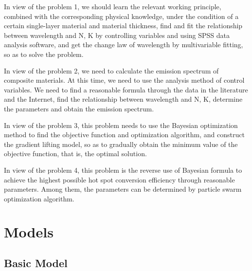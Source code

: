 \documentclass{apmcmthesis}
\begin{document}
In view of the problem 1, we should learn the relevant working principle, combined with the corresponding physical knowledge, under the condition of a certain single-layer material and material thickness, find and fit the relationship between wavelength and N, K by controlling variables and using SPSS data analysis software, and get the change law of wavelength by multivariable fitting, so as to solve the problem.\par

In view of the problem 2, we need to calculate the emission spectrum of composite materials. At this time, we need to use the analysis method of control variables. We need to find a reasonable formula through the data in the literature and the Internet, find the relationship between wavelength and N, K, determine the parameters and obtain the emission spectrum.\par

In view of the problem 3, this problem needs to use the Bayesian optimization method to find the objective function and optimization algorithm, and construct the gradient lifting model, so as to gradually obtain the minimum value of the objective function, that is, the optimal solution.\par

In view of the problem 4, this problem is the reverse use of Bayesian formula to achieve the highest possible hot spot conversion efficiency through reasonable parameters. Among them, the parameters can be determined by particle swarm optimization algorithm.\par

\newpage
\section{Models}
\subsection{Basic Model}
\end{document}
